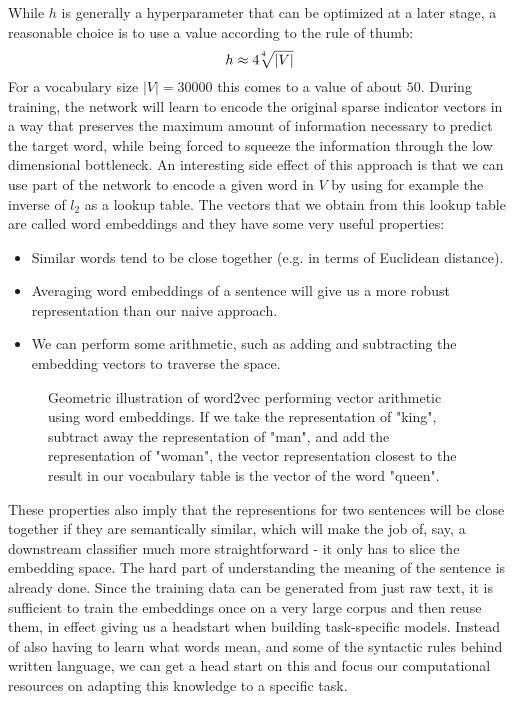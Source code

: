 While $h$ is generally a hyperparameter that can be optimized at a later stage, a reasonable choice is to use a value according to the rule of thumb:
\begin{equation}
  h \approx 4\sqrt[\leftroot{3} \uproot{3} 4]{|V|}
\end{equation}
For a vocabulary size $|V| = 30000$ this comes to a value of about $50$.
During training, the network will learn to encode the original sparse indicator vectors in a way that preserves the maximum amount of information necessary to predict the target word, while being forced to squeeze the information through the low dimensional bottleneck.
An interesting side effect of this approach is that we can use part of the network to encode a given word in $V$ by using for example the inverse of $l_2$ as a lookup table.
The vectors that we obtain from this lookup table are called word embeddings and they have some very useful properties:
\begin{itemize}
    \item Similar words tend to be close together (e.g. in terms of Euclidean distance).
    \item Averaging word embeddings of a sentence will give us a more robust representation than our naive approach.
    \item We can perform some arithmetic, such as adding and subtracting the embedding vectors to traverse the space.
\end{itemize}
\begin{figure}
  
  \caption{Geometric illustration of word2vec performing vector arithmetic using word embeddings. If we take the representation of "king", subtract away the representation of "man", and add the representation of "woman", the vector representation closest to the result in our vocabulary table is the vector of the word "queen".}
  \label{fig:kingmanwoman}
\end{figure}
These properties also imply that the representions for two sentences will be close together if they are semantically similar, which will make the job of, say, a downstream classifier much more straightforward - it only has to slice the embedding space.
The hard part of understanding the meaning of the sentence is already done.
Since the training data can be generated from just raw text, it is sufficient to train the embeddings once on a very large corpus and then reuse them, in effect giving us a headstart when building task-specific models.\cite{pennington-etal-2014-glove}
Instead of also having to learn what words mean, and some of the syntactic rules behind written language, we can get a head start on this and focus our computational resources on adapting this knowledge to a specific task.

